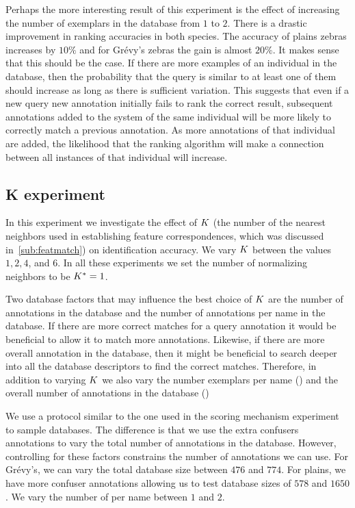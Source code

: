         Perhaps the more interesting result of this experiment is the effect of increasing the number of exemplars
        in the database from $1$ to $2$. There is a drastic improvement in ranking accuracies in both species. The
        accuracy of plains zebras increases by $10\percent$ and for Grévy's zebras the gain is almost $20\percent$.
        It makes sense that this should be the case. If there are more examples of an individual in the database,
        then the probability that the query is similar to at least one of them should increase as long as there is
        sufficient variation. This suggests that even if a new query new annotation initially fails to rank the
        correct result, subsequent annotations added to the system of the same individual will be more likely to
        correctly match a previous annotation. As more annotations of that individual are added, the likelihood that
        the ranking algorithm will make a connection between all instances of that individual will increase.

        \NScoreExpt{}


    \FloatBarrier{}
    \subsection{K experiment}\label{sub:exptk}  

        In this experiment we investigate the effect of $K$ (the number of the nearest neighbors used in
        establishing feature correspondences, which was discussed in~\cref{sub:featmatch}) on identification
        accuracy. We vary $K$ between the values $1, 2, 4$, and $6$. In all these experiments we set the number of
        normalizing neighbors to be $K^{*}=1$.

        Two database factors that may influence the best choice of $K$ are the number of annotations in the
        database and the number of annotations per name in the database. If there are more correct matches for a
        query annotation it would be beneficial to allow it to match more annotations. Likewise, if there are more
        overall annotation in the database, then it might be beneficial to search deeper into all the database
        descriptors to find the correct matches. Therefore, in addition to varying $K$ we also vary the number
        exemplars per name () and the overall number of annotations in the database ()

        We use a protocol similar to the one used in the scoring mechanism experiment to sample databases.
        The difference is that we use the extra confusers annotations to vary the total number of annotations in
          the database.
        However, controlling for these factors constrains the number of annotations we can use.
        For Grévy's, we can vary the total database size between $476$ and $774$.
        For plains, we have more confuser annotations allowing us to test database sizes of $578$ and $1650$.
        We vary the number of \exemplars{} per name between $1$ and $2$.

